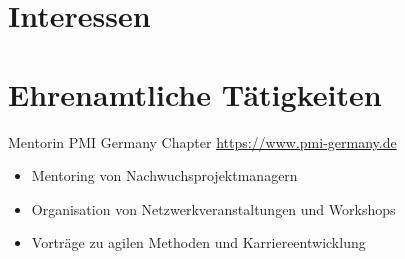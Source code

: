 \documentclass[a4paper, serif, 10pt]{moderncv}
\begin{document}
\section{Interessen}

\section{Ehrenamtliche Tätigkeiten}

        {Mentorin}
        {PMI Germany Chapter}
        {\url{https://www.pmi-germany.de}}
        {}
        {\begin{itemize}
\item Mentoring von Nachwuchsprojektmanagern
\item Organisation von Netzwerkveranstaltungen und Workshops
\item Vorträge zu agilen Methoden und Karriereentwicklung
\end{itemize}}
    
\end{document}
